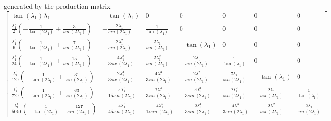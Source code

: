 generated by the production matrix
\begin{displaymath}
\left[\begin{matrix}\tan{\left (\lambda_{1} \right )} \lambda_{1} & - \tan{\left (\lambda_{1} \right )} & 0 & 0 & 0 & 0 & 0\\\frac{\lambda_{1}^{2}}{2} \left(- \frac{1}{\tan{\left (2 \lambda_{1} \right )}} + \frac{3}{sin\,{\left (2 \lambda_{1} \right )}}\right) & - \frac{2 \lambda_{1}}{sin\,{\left (2 \lambda_{1} \right )}} & \frac{1}{\tan{\left (\lambda_{1} \right )}} & 0 & 0 & 0 & 0\\\frac{\lambda_{1}^{3}}{6} \left(- \frac{1}{\tan{\left (2 \lambda_{1} \right )}} + \frac{7}{sin\,{\left (2 \lambda_{1} \right )}}\right) & - \frac{2 \lambda_{1}^{2}}{sin\,{\left (2 \lambda_{1} \right )}} & \frac{2 \lambda_{1}}{sin\,{\left (2 \lambda_{1} \right )}} & - \tan{\left (\lambda_{1} \right )} & 0 & 0 & 0\\\frac{\lambda_{1}^{4}}{24} \left(- \frac{1}{\tan{\left (2 \lambda_{1} \right )}} + \frac{15}{sin\,{\left (2 \lambda_{1} \right )}}\right) & - \frac{4 \lambda_{1}^{3}}{3 sin\,{\left (2 \lambda_{1} \right )}} & \frac{2 \lambda_{1}^{2}}{sin\,{\left (2 \lambda_{1} \right )}} & - \frac{2 \lambda_{1}}{sin\,{\left (2 \lambda_{1} \right )}} & \frac{1}{\tan{\left (\lambda_{1} \right )}} & 0 & 0\\\frac{\lambda_{1}^{5}}{120} \left(- \frac{1}{\tan{\left (2 \lambda_{1} \right )}} + \frac{31}{sin\,{\left (2 \lambda_{1} \right )}}\right) & - \frac{2 \lambda_{1}^{4}}{3 sin\,{\left (2 \lambda_{1} \right )}} & \frac{4 \lambda_{1}^{3}}{3 sin\,{\left (2 \lambda_{1} \right )}} & - \frac{2 \lambda_{1}^{2}}{sin\,{\left (2 \lambda_{1} \right )}} & \frac{2 \lambda_{1}}{sin\,{\left (2 \lambda_{1} \right )}} & - \tan{\left (\lambda_{1} \right )} & 0\\\frac{\lambda_{1}^{6}}{720} \left(- \frac{1}{\tan{\left (2 \lambda_{1} \right )}} + \frac{63}{sin\,{\left (2 \lambda_{1} \right )}}\right) & - \frac{4 \lambda_{1}^{5}}{15 sin\,{\left (2 \lambda_{1} \right )}} & \frac{2 \lambda_{1}^{4}}{3 sin\,{\left (2 \lambda_{1} \right )}} & - \frac{4 \lambda_{1}^{3}}{3 sin\,{\left (2 \lambda_{1} \right )}} & \frac{2 \lambda_{1}^{2}}{sin\,{\left (2 \lambda_{1} \right )}} & - \frac{2 \lambda_{1}}{sin\,{\left (2 \lambda_{1} \right )}} & \frac{1}{\tan{\left (\lambda_{1} \right )}}\\\frac{\lambda_{1}^{7}}{5040} \left(- \frac{1}{\tan{\left (2 \lambda_{1} \right )}} + \frac{127}{sin\,{\left (2 \lambda_{1} \right )}}\right) & - \frac{4 \lambda_{1}^{6}}{45 sin\,{\left (2 \lambda_{1} \right )}} & \frac{4 \lambda_{1}^{5}}{15 sin\,{\left (2 \lambda_{1} \right )}} & - \frac{2 \lambda_{1}^{4}}{3 sin\,{\left (2 \lambda_{1} \right )}} & \frac{4 \lambda_{1}^{3}}{3 sin\,{\left (2 \lambda_{1} \right )}} & - \frac{2 \lambda_{1}^{2}}{sin\,{\left (2 \lambda_{1} \right )}} & \frac{2 \lambda_{1}}{sin\,{\left (2 \lambda_{1} \right )}}\end{matrix}\right]
\end{displaymath}
